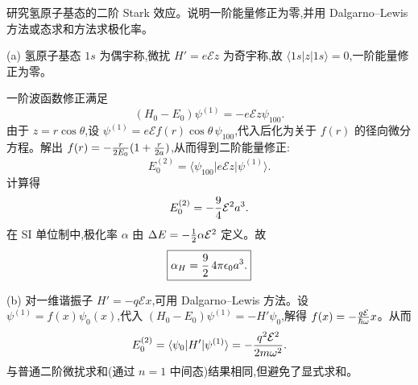\begin{question}
研究氢原子基态的二阶 Stark 效应。说明一阶能量修正为零,并用 Dalgarno--Lewis 方法或态求和方法求极化率。
\end{question}
\begin{solution}
(a) 氢原子基态 $1s$ 为偶宇称,微扰 $H'=e\mathcal Ez$ 为奇宇称,故 $\langle 1s|z|1s\rangle=0$,一阶能量修正为零。

一阶波函数修正满足
\[
(H_0 - E_0)\psi^{(1)} = -e\mathcal E z\psi_{100}.
\]
由于 $z = r\cos\theta$,设 $\psi^{(1)} = e\mathcal E f(r)\cos\theta\,\psi_{100}$,代入后化为关于 $f(r)$ 的径向微分方程。解出 $f(r) = -{r\over2E_0}(1+{r\over2a})$,从而得到二阶能量修正:
\[
E_0^{(2)} = \langle\psi_{100}|e\mathcal E z|\psi^{(1)}\rangle.
\]
计算得
\[
E_0^{(2)} = -{9\over4}\mathcal E^2 a^3.
\]
在 SI 单位制中,极化率 $\alpha$ 由 $\Delta E = -{1\over2}\alpha\mathcal E^2$ 定义。故
\[
\boxed{\alpha_H = {9\over2}\,4\pi\epsilon_0 a^3.}
\]

(b) 对一维谐振子 $H'=-q\mathcal Ex$,可用 Dalgarno--Lewis 方法。设 $\psi^{(1)} = f(x)\psi_0(x)$,代入 $(H_0-E_0)\psi^{(1)} = -H'\psi_0$,解得 $f(x) = -{q\mathcal E\over\hbar\omega}x$。从而
\[
E_0^{(2)} = \langle\psi_0|H'|\psi^{(1)}\rangle = -{q^2\mathcal E^2\over2m\omega^2}.
\]
与普通二阶微扰求和(通过 $n=1$ 中间态)结果相同,但避免了显式求和。
\end{solution}

